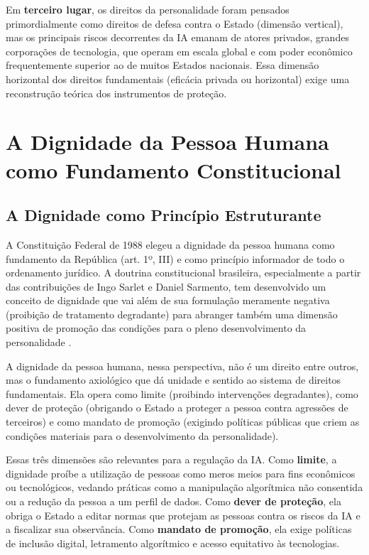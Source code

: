 Em \textbf{terceiro lugar}, os direitos da personalidade foram pensados primordialmente como direitos de defesa contra o Estado (dimensão vertical), mas os principais riscos decorrentes da IA emanam de atores privados, grandes corporações de tecnologia, que operam em escala global e com poder econômico frequentemente superior ao de muitos Estados nacionais. Essa dimensão horizontal dos direitos fundamentais (eficácia privada ou horizontal) exige uma reconstrução teórica dos instrumentos de proteção.

\section{A Dignidade da Pessoa Humana como Fundamento Constitucional}
\label{sec:dignidade-constitucional}

\subsection{A Dignidade como Princípio Estruturante}
\label{subsec:dignidade-principio}

A Constituição Federal de 1988 elegeu a dignidade da pessoa humana como fundamento da República (art. 1º, III) e como princípio informador de todo o ordenamento jurídico. A doutrina constitucional brasileira, especialmente a partir das contribuições de Ingo Sarlet e Daniel Sarmento, tem desenvolvido um conceito de dignidade que vai além de sua formulação meramente negativa (proibição de tratamento degradante) para abranger também uma dimensão positiva de promoção das condições para o pleno desenvolvimento da personalidade \cite{Sarlet2021DF, Sarmento2016DPF}.

A dignidade da pessoa humana, nessa perspectiva, não é um direito entre outros, mas o fundamento axiológico que dá unidade e sentido ao sistema de direitos fundamentais. Ela opera como limite (proibindo intervenções degradantes), como dever de proteção (obrigando o Estado a proteger a pessoa contra agressões de terceiros) e como mandato de promoção (exigindo políticas públicas que criem as condições materiais para o desenvolvimento da personalidade).

Essas três dimensões são relevantes para a regulação da IA. Como \textbf{limite}, a dignidade proíbe a utilização de pessoas como meros meios para fins econômicos ou tecnológicos, vedando práticas como a manipulação algorítmica não consentida ou a redução da pessoa a um perfil de dados. Como \textbf{dever de proteção}, ela obriga o Estado a editar normas que protejam as pessoas contra os riscos da IA e a fiscalizar sua observância. Como \textbf{mandato de promoção}, ela exige políticas de inclusão digital, letramento algorítmico e acesso equitativo às tecnologias.

